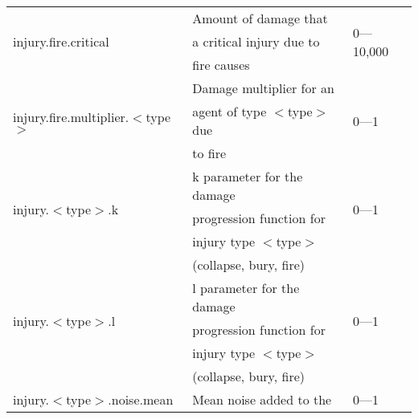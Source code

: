\documentclass{article}
\begin{document}
\begin{table}[htb]
\begin{tabular}{lll}
  \hline
  \multirow{3}{*}{injury.fire.critical}                     & Amount of damage
  that                                  & \multirow{3}{*}{0---10,000}\\
                                                            & a critical injury
  due to                                & \\
                                                            & fire causes      
                                        & \\
  \hline
  \multirow{3}{*}{injury.fire.multiplier.$<$type$>$}        &  Damage multiplier
  for an                                & \multirow{3}{*}{0---1}\\
                                                            & agent of type
  $<$type$>$ due                        & \\
                                                            & to fire          
                                        & \\
  \hline
  \multirow{3}{*}{injury.$<$type$>$.k}                      & k parameter for
  the damage                            & \multirow{3}{*}{0---1}\\
                                                            & progression
  function for                          & \\
                                                            & injury type
  $<$type$>$                            & \\
                                                            & (collapse, bury,
  fire)                                 & \\
  \hline
  \multirow{3}{*}{injury.$<$type$>$.l}                      & l parameter for
  the damage                            & \multirow{3}{*}{0---1}\\
                                                            & progression
  function for                          & \\
                                                            & injury type
  $<$type$>$                            & \\
                                                            & (collapse, bury,
  fire)                                 & \\
  \hline
  \multirow{3}{*}{injury.$<$type$>$.noise.mean}             & Mean noise added
  to the                                & \multirow{3}{*}{0---1}\\

\end{tabular}
\end{table}
\end{document}
